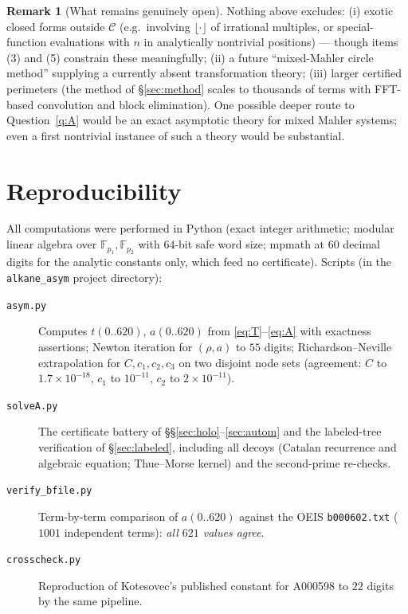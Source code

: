 \documentclass[11pt]{article}
\theoremstyle{definition}
\newtheorem{remark}[theorem]{Remark}
\newcommand{\FF}{\mathbb{F}}
\newcommand{\seqT}{\textnormal{A000598}}
\begin{document}
\begin{remark}[What remains genuinely open]
Nothing above excludes: (i) exotic closed forms outside $\mathcal{C}$ (e.g.\
involving $\lfloor\cdot\rfloor$ of irrational multiples, or special-function
evaluations with $n$ in analytically nontrivial positions) --- though
items (3) and (5) constrain these meaningfully; (ii) a future
``mixed-Mahler circle method'' supplying a currently absent transformation
theory;
(iii) larger certified perimeters (the method of \S\ref{sec:method} scales to
thousands of terms with FFT-based convolution and block elimination). One
possible deeper route to Question~\ref{q:A} would be an exact asymptotic theory
for mixed Mahler systems; even a first nontrivial instance of such a theory
would be substantial.
\end{remark}

\appendix
\section{Reproducibility}\label{app:repro}

All computations were performed in Python (exact integer arithmetic; modular
linear algebra over $\FF_{p_1},\FF_{p_2}$ with $64$-bit safe word size; mpmath
at $60$ decimal digits for the analytic constants only, which feed no
certificate). Scripts (in the \texttt{alkane\_asym} project directory):

\begin{description}
\item[\texttt{asym.py}] Computes $t(0..620)$, $a(0..620)$ from
\eqref{eq:T}--\eqref{eq:A} with exactness assertions; Newton iteration for
$(\rho,a)$ to $55$ digits; Richardson--Neville extrapolation for
$C,c_1,c_2,c_3$ on two disjoint node sets (agreement: $C$ to $1.7\times10^{-18}$,
$c_1$ to $10^{-11}$, $c_2$ to $2\times10^{-11}$).
\item[\texttt{solveA.py}] The certificate battery of
\S\S\ref{sec:holo}--\ref{sec:autom} and the labeled-tree verification of
\S\ref{sec:labeled}, including all decoys (Catalan recurrence and algebraic
equation; Thue--Morse kernel) and the second-prime re-checks.
\item[\texttt{verify\_bfile.py}] Term-by-term comparison of $a(0..620)$ against
the OEIS \texttt{b000602.txt} ($1001$ independent terms): \emph{all $621$ values
agree}.
\item[\texttt{crosscheck.py}] Reproduction of Kotesovec's published constant for
\seqT{} to $22$ digits by the same pipeline.
\end{description}
\end{document}
